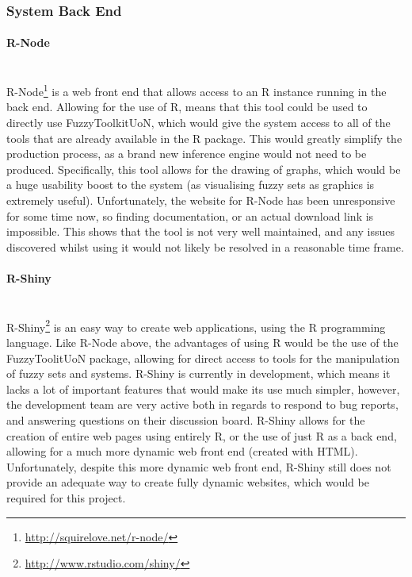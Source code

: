 \subsubsection{System Back End}
\paragraph{R-Node}\ \\
R-Node\footnote{\url{http://squirelove.net/r-node/}} is a web front end that allows access to an R instance running in the back end. Allowing for the use of R, means that this tool could be used to directly use FuzzyToolkitUoN, which would give the system access to all of the tools that are already available in the R package. This would greatly simplify the production process, as a brand new inference engine would not need to be produced. Specifically, this tool allows for the drawing of graphs, which would be a huge usability boost to the system (as visualising fuzzy sets as graphics is extremely useful). Unfortunately, the website for R-Node has been unresponsive for some time now, so finding documentation, or an actual download link is impossible. This shows that the tool is not very well maintained, and any issues discovered whilst using it would not likely be resolved in a reasonable time frame.

\paragraph{R-Shiny}\ \\
R-Shiny\footnote{\url{http://www.rstudio.com/shiny/}} is an easy way to create web applications, using the R programming language. Like R-Node above, the advantages of using R would be the use of the FuzzyToolitUoN package, allowing for direct access to tools for the manipulation of fuzzy sets and systems. R-Shiny is currently in development, which means it lacks a lot of important features that would make its use much simpler, however, the development team are very active both in regards to respond to bug reports, and answering questions on their discussion board. R-Shiny allows for the creation of entire web pages using entirely R, or the use of just R as a back end, allowing for a much more dynamic web front end (created with HTML). Unfortunately, despite this more dynamic web front end, R-Shiny still does not provide an adequate way to create fully dynamic websites, which would be required for this project.

